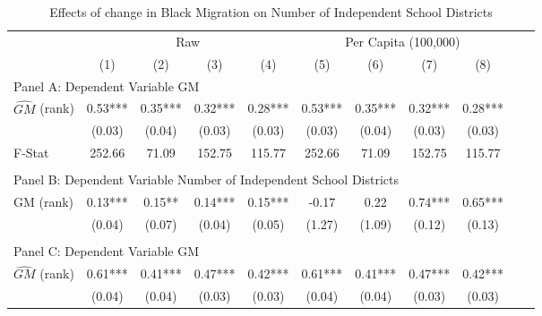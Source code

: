  \begin{table}[htbp]\centering {} \begin{threeparttable} \caption{Effects of change in Black Migration on Number of Independent School Districts} \begin{tabular}{l*{10}{c}} \toprule
                &\multicolumn{4}{c}{Raw}                                    &\multicolumn{4}{c}{Per Capita (100,000)}                   \\\cmidrule(lr){2-5}\cmidrule(lr){6-9}
                &\multicolumn{1}{c}{(1)}   &\multicolumn{1}{c}{(2)}   &\multicolumn{1}{c}{(3)}   &\multicolumn{1}{c}{(4)}   &\multicolumn{1}{c}{(5)}   &\multicolumn{1}{c}{(6)}   &\multicolumn{1}{c}{(7)}   &\multicolumn{1}{c}{(8)}   \\
\cmidrule(lr){1-9}
\multicolumn{8}{l}{Panel A: Dependent Variable GM}\\
\cmidrule(lr){1-9}
$\hat{GM}$ (rank)&       0.53***&       0.35***&       0.32***&       0.28***&       0.53***&       0.35***&       0.32***&       0.28***\\
                &     (0.03)   &     (0.04)   &     (0.03)   &     (0.03)   &     (0.03)   &     (0.04)   &     (0.03)   &     (0.03)   \\
\midrule
F-Stat          &     252.66   &      71.09   &     152.75   &     115.77   &     252.66   &      71.09   &     152.75   &     115.77   \\
\cmidrule[\heavyrulewidth](lr){1-9} \\ \cmidrule[\heavyrulewidth](lr){1-9}
\multicolumn{8}{l}{Panel B: Dependent Variable Number of Independent School Districts}\\
\cmidrule(lr){1-9}
GM  (rank)      &       0.13***&       0.15** &       0.14***&       0.15***&      -0.17   &       0.22   &       0.74***&       0.65***\\
                &     (0.04)   &     (0.07)   &     (0.04)   &     (0.05)   &     (1.27)   &     (1.09)   &     (0.12)   &     (0.13)   \\
\cmidrule[\heavyrulewidth](lr){1-9} \\ \cmidrule[\heavyrulewidth](lr){1-9}
\multicolumn{8}{l}{Panel C: Dependent Variable GM}\\
\cmidrule(lr){1-9}
$\hat{GM}$ (rank)&       0.61***&       0.41***&       0.47***&       0.42***&       0.61***&       0.41***&       0.47***&       0.42***\\
                &     (0.04)   &     (0.04)   &     (0.03)   &     (0.03)   &     (0.04)   &     (0.04)   &     (0.03)   &     (0.03)   \\

\end{tabular}
\end{threeparttable}
\end{table}
